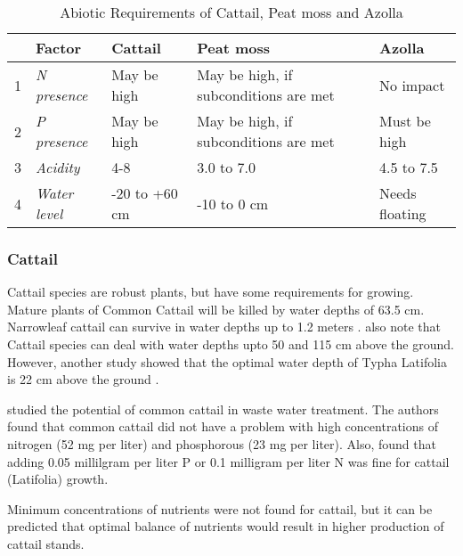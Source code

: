 \documentclass[12pt,a4paper,titlepage]{article}
\begin{document}
\begin{table}[htbp]
\caption{Abiotic Requirements of Cattail, Peat moss and Azolla}
\begin{flushleft}
\begin{tabular}{|r|l|l|l|l|}
\hline
\multicolumn{1}{|l|}{} & \textbf{Factor} & \textbf{Cattail} & \textbf{Peat moss} & \textbf{Azolla} \\ \hline
1 & \textit{N presence} & May be high & May be high, if subconditions are met & No impact \\ \hline
2 & \textit{P presence} & May be high & May be high, if subconditions are met & Must be high \\ \hline
3 & \textit{Acidity} & 4-8 & 3.0 to 7.0 & 4.5 to 7.5 \\ \hline
4 & \textit{Water level} & -20 to +60 cm & -10 to 0 cm & Needs floating  \\ \hline
\end{tabular}
\end{flushleft}
\label{tab:phy}
\end{table}



\subsubsection{Cattail}



Cattail species are robust plants, but have some requirements for growing. Mature plants of Common Cattail will be killed by water depths of 63.5 cm. Narrowleaf cattail can survive in water depths up to 1.2 meters \citep{morton1975cattails}. \citet{dubbe1988production} also note that Cattail species can deal with water depths upto 50 and 115 cm above the ground. However, another study showed that the optimal water depth of Typha Latifolia is 22 cm above the ground \citep{grace1989effects}.

\citet{ciria2005Typha} studied the potential of common cattail in waste water treatment. The authors found that common cattail did not have a problem with high concentrations of nitrogen (52 mg per liter) and phosphorous (23 mg per liter). Also, \citet{newman1996effects} found that adding 0.05 millilgram per liter P or 0.1 milligram per liter N was fine for cattail (Latifolia) growth.

Minimum concentrations of nutrients were not found for cattail, but it can be predicted that optimal balance of nutrients would result in higher production of cattail stands.
\end{document}
